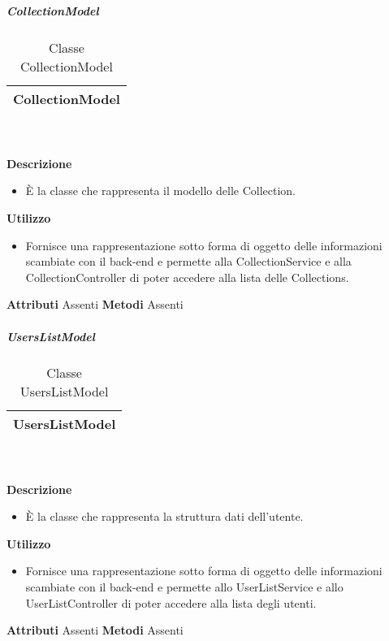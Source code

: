 			\subparagraph{CollectionModel} 
\begin{table}[ht]
\begin{center}
\bgroup
	\setlength{\arrayrulewidth}{0.6mm}
	\def\arraystretch{1}
		\begin{tabular}{ | p{12cm} | }
				\hline  
					\centerline{\textbf{CollectionModel}}
		\\ \hline 
				\hline
				\hline
		
		\end{tabular}
\egroup
\caption{Classe CollectionModel}
\end{center}
\end{table} \textbf{\\ \\ Descrizione}
\begin{itemize}
\item[] È la classe che rappresenta il modello delle Collection.
\end{itemize} 
\textbf{Utilizzo}
\begin{itemize}
\item[] Fornisce una rappresentazione sotto forma di oggetto delle informazioni scambiate con il back-end e permette alla CollectionService e alla CollectionController di poter accedere alla lista delle Collections.
\end{itemize}
\textbf{Attributi}
Assenti
\textbf{Metodi}
Assenti

			\subparagraph{UsersListModel} 
\begin{table}[ht]
\begin{center}
\bgroup
	\setlength{\arrayrulewidth}{0.6mm}
	\def\arraystretch{1}
		\begin{tabular}{ | p{12cm} | }
				\hline  
					\centerline{\textbf{UsersListModel}}
		\\ \hline 
				\hline
				\hline
		
		\end{tabular}
\egroup
\caption{Classe UsersListModel}
\end{center}
\end{table} \textbf{\\ \\ Descrizione}
\begin{itemize}
\item[] È la classe che rappresenta la struttura dati dell'utente.
\end{itemize} 
\textbf{Utilizzo}
\begin{itemize}
\item[] Fornisce una rappresentazione sotto forma di oggetto delle informazioni scambiate con il back-end e permette allo UserListService e allo UserListController di poter accedere alla lista degli utenti.
\end{itemize}
\textbf{Attributi}
Assenti
\textbf{Metodi}
Assenti
